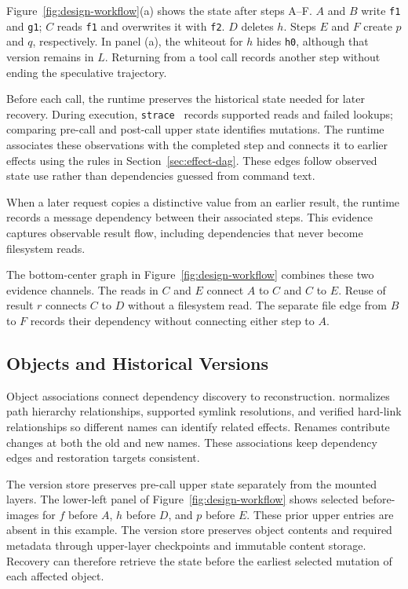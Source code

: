 Figure~\ref{fig:design-workflow}(a) shows the state after steps A--F.
$A$ and $B$ write \texttt{f1} and \texttt{g1}; $C$ reads \texttt{f1} and
overwrites it with \texttt{f2}. $D$ deletes $h$.
Steps $E$ and $F$ create $p$ and $q$, respectively.
In panel (a), the whiteout for $h$ hides \texttt{h0}, although that version
remains in $L$.
Returning from a tool call records another step without ending the speculative
trajectory.

Before each call, the runtime preserves the historical state needed for later
recovery. During execution, \texttt{strace}~\cite{strace} records supported reads
and failed lookups; comparing pre-call and post-call upper state identifies
mutations. The runtime associates these observations with the completed step
and connects it to earlier effects using the rules in Section~\ref{sec:effect-dag}.
These edges follow observed state use rather than dependencies guessed from
command text.

When a later request copies a distinctive value from an earlier result, the
runtime records a message dependency between their associated steps.
This evidence captures observable result flow, including dependencies that
never become filesystem reads.

The bottom-center graph in Figure~\ref{fig:design-workflow} combines these two
evidence channels.
The reads in $C$ and $E$ connect $A$ to $C$ and $C$ to $E$.
Reuse of result $r$ connects $C$ to $D$ without a filesystem read.
The separate file edge from $B$ to $F$ records their dependency without
connecting either step to $A$.

\subsection{Objects and Historical Versions}

Object associations connect dependency discovery to reconstruction. \system
normalizes path hierarchy relationships, supported symlink resolutions, and
verified hard-link relationships so different names can identify related
effects. Renames contribute changes at both the old and new names. These
associations keep dependency edges and restoration targets consistent.

The version store preserves pre-call upper state separately from the mounted
layers.
The lower-left panel of Figure~\ref{fig:design-workflow} shows selected
before-images for $f$ before $A$, $h$ before $D$, and $p$ before $E$.
These prior upper entries are absent in this example.
The version store preserves object contents and required metadata through
upper-layer checkpoints and immutable content storage.
Recovery can therefore retrieve the state before the earliest selected
mutation of each affected object.

